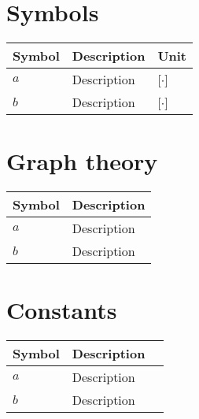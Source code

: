 \section*{Symbols}


\begin{tabular}{l l l} 
	\textbf{Symbol}		&	\textbf{Description}										& \textbf{Unit}	\\\hline
	$a$					&	Description									    			& [$\cdot$]\\
	$b$					&	Description 						    					& [$\cdot$]\\	
\end{tabular}

\section*{Graph theory}

\begin{tabular}{l l} 
	\textbf{Symbol}		&	\textbf{Description}										\\\hline
	$a$					&	Description									    			\\
	$b$					&	Description		    										\\
\end{tabular}	

\section*{Constants}

\begin{tabular}{l l l} 
	\textbf{Symbol}		&	\textbf{Description}										\\\hline
	$a$					&	Description									    			\\
	$b$					&	Description		    										\\
\end{tabular}	


